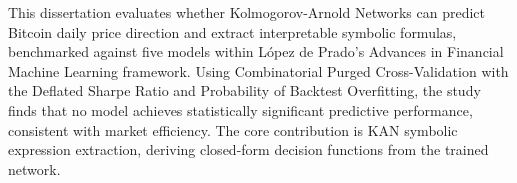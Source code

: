 \documentclass[12pt,a4paper,oneside]{article}
\begin{document}
%
This dissertation evaluates whether Kolmogorov-Arnold Networks can predict Bitcoin daily price direction and extract interpretable symbolic formulas, benchmarked against five models within López de Prado's Advances in Financial Machine Learning framework. Using Combinatorial Purged Cross-Validation with the Deflated Sharpe Ratio and Probability of Backtest Overfitting, the study finds that no model achieves statistically significant predictive performance, consistent with market efficiency. The core contribution is KAN symbolic expression extraction, deriving closed-form decision functions from the trained network.
\end{document}
